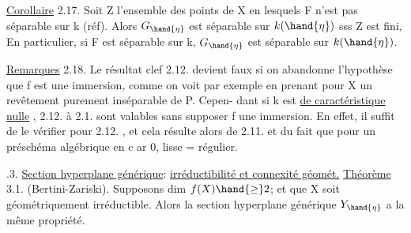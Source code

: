 
\uline{Corollaire} 2.17.   Soit Z l'ensemble des points de X en lesquels F
n'est pas séparable sur k (réf). Alors  $G_{\hand{\eta}}$ est séparable sur $k(\hand{\eta})$ sss
Z est fini, En particulier, si F est séparable sur k, $G_{\hand{\eta}}$ est séparable
sur $k(\hand{\eta})$.

\uline{Remarques} 2.18.  Le résultat clef  2.12.  devient faux si on abandonne
l'hypothèse que f est une immersion, comme  on voit par exemple en
prenant pour  X un revêtement purement inséparable de P.   Cepen-%
dant 
  si  k est \uline{de caractéristique nulle} ,  2.12. à
2.1. sont valables sans supposer f une immersion.  En effet, il suffit
de le vérifier pour 2.12. , et  cela résulte alors de 2.11. et du fait
que  pour un préschéma algébrique en c ar 0,  lisse = régulier.


.3.   \uline{Section hyperplane générique}: \uline{irréductibilité et connexité géomét.}
\uline{Théorème} 3.1. (Bertini-Zariski).  Supposons dim $f(X) \hand{\geq} 2$; et que X
soit  géométriquement irréductible. Alors
la section hyperplane générique $Y_{\hand{\eta}}$ a la même propriété.

